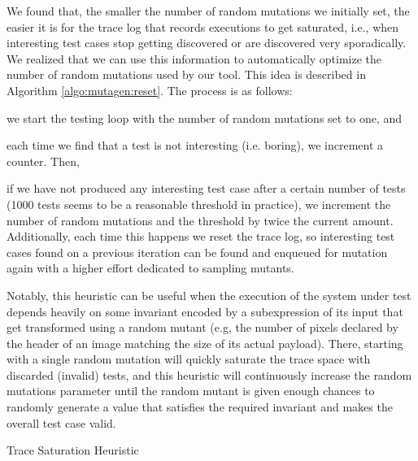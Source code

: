 \documentclass[sigconf,review,anonymous]{acmart}
\begin{document}
We found that, the smaller the number of random mutations we initially set, the
easier it is for the trace log that records executions to get saturated, i.e.,
when interesting test cases stop getting discovered or are discovered very
sporadically.
%
We realized that we can use this information to automatically optimize the
number of random mutations used by our tool.
%
This idea is described in Algorithm \ref{algo:mutagen:reset}.
%
The process is as follows:
%
\begin{inparaenum}
  \item we start the testing loop with the number of random mutations set to
    one, and
  \item each time we find that a test is not interesting (i.e. boring), we
    increment a counter.
  Then,
  \item if we have not produced any interesting test case after a certain number
    of tests (1000 tests seems to be a reasonable threshold in practice), we
    increment the number of random mutations and the threshold by twice the
    current amount.
    Additionally, each time this happens we reset the trace log, so interesting
    test cases found on a previous iteration can be found and enqueued for
    mutation again with a higher effort dedicated to sampling mutants.
\end{inparaenum}

Notably, this heuristic can be useful when the execution of the system under
test depends heavily on some invariant encoded by a subexpression of its input
that get transformed using a random mutant (e.g, the number of pixels declared
by the header of an image matching the size of its actual payload).
%
There, starting with a single random mutation will quickly saturate the trace
space with discarded (invalid) tests, and this heuristic will continuously
increase the random mutations parameter until the random mutant is given enough
chances to randomly generate a value that satisfies the required invariant and
makes the overall test case valid.

\begin{algorithm}[t]
  \SetAlgoLined
  \DontPrintSemicolon

\caption{\label{algo:mutagen:reset}Trace Saturation Heuristic}
\end{algorithm}
\end{document}
